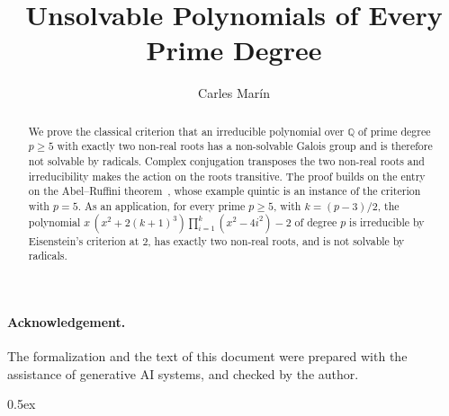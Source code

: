 \documentclass[10pt,a4paper]{article}
\begin{document}
\title{Unsolvable Polynomials of Every Prime Degree}
\author{Carles Mar\'in}
\maketitle

\begin{abstract}
We prove the classical criterion that an irreducible polynomial over $\mathbb{Q}$ of prime degree $p\ge 5$ with
exactly two non-real roots has a non-solvable Galois group and is therefore not solvable by radicals. Complex
conjugation transposes the two non-real roots and irreducibility makes the action on the roots transitive. The proof
builds on the entry on the Abel--Ruffini theorem~\cite{Unsolvable_Quintic-AFP}, whose example quintic is an instance of the criterion with $p=5$. As an
application, for every prime $p\ge 5$, with $k=(p-3)/2$, the polynomial
$x\,(x^2+2(k+1)^3)\prod_{i=1}^{k}(x^2-4i^2)-2$ of degree $p$ is irreducible by Eisenstein's criterion at $2$, has
exactly two non-real roots, and is not solvable by radicals.
\end{abstract}

\paragraph{Acknowledgement.} The formalization and the text of this document were prepared with the
assistance of generative AI systems, and checked by the author.

\tableofcontents

\parindent 0pt\parskip 0.5ex





\end{document}
